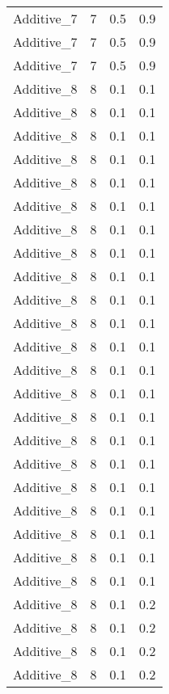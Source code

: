 \documentclass{article}
\begin{document}
\begin{longtable}[H]{lrrr}
 Additive\_7 &       7 &   0.5 &            0.9 \\
 Additive\_7 &       7 &   0.5 &            0.9 \\
 Additive\_7 &       7 &   0.5 &            0.9 \\
 Additive\_8 &       8 &   0.1 &            0.1 \\
 Additive\_8 &       8 &   0.1 &            0.1 \\
 Additive\_8 &       8 &   0.1 &            0.1 \\
 Additive\_8 &       8 &   0.1 &            0.1 \\
 Additive\_8 &       8 &   0.1 &            0.1 \\
 Additive\_8 &       8 &   0.1 &            0.1 \\
 Additive\_8 &       8 &   0.1 &            0.1 \\
 Additive\_8 &       8 &   0.1 &            0.1 \\
 Additive\_8 &       8 &   0.1 &            0.1 \\
 Additive\_8 &       8 &   0.1 &            0.1 \\
 Additive\_8 &       8 &   0.1 &            0.1 \\
 Additive\_8 &       8 &   0.1 &            0.1 \\
 Additive\_8 &       8 &   0.1 &            0.1 \\
 Additive\_8 &       8 &   0.1 &            0.1 \\
 Additive\_8 &       8 &   0.1 &            0.1 \\
 Additive\_8 &       8 &   0.1 &            0.1 \\
 Additive\_8 &       8 &   0.1 &            0.1 \\
 Additive\_8 &       8 &   0.1 &            0.1 \\
 Additive\_8 &       8 &   0.1 &            0.1 \\
 Additive\_8 &       8 &   0.1 &            0.1 \\
 Additive\_8 &       8 &   0.1 &            0.1 \\
 Additive\_8 &       8 &   0.1 &            0.1 \\
 Additive\_8 &       8 &   0.1 &            0.2 \\
 Additive\_8 &       8 &   0.1 &            0.2 \\
 Additive\_8 &       8 &   0.1 &            0.2 \\
 Additive\_8 &       8 &   0.1 &            0.2 \\

\end{longtable}
\end{document}
